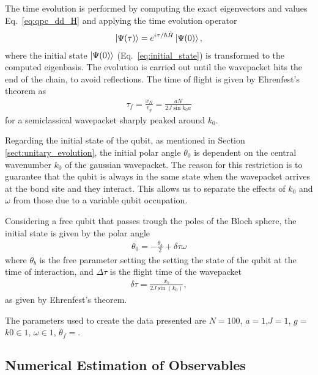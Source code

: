 \documentclass[10pt,
 amsmath,amssymb,
 aps,prb, twocolumn
]{revtex4-2}
\newcommand\sj[1]{ {\color{cyan} #1} }
\begin{document}
The time evolution is performed by computing the exact eigenvectors and values Eq.~\eqref{eq:qpc_dd_H} and applying the time evolution operator
\begin{align}\label{eq:time_evolution_ed}
    \ket{\Psi{(\tau)}} = e^{i\tau/\hbar \hat{H}}\ket{\Psi (0)},
\end{align}
where the initial state \mbox{$\ket{\Psi (0)}$} (Eq.~\eqref{eq:initial_state}) is transformed to the computed eigenbasis. The evolution is carried out until the wavepacket hits the end of the chain, to avoid reflections. The time of flight is given by Ehrenfest's theorem as
\begin{align}\label{eq:final_time}
    \tau_f = \frac{x_N}{v_g} =  \frac{a N}{2 J \sin{k_0a}}
\end{align}
for a semiclassical wavepacket sharply peaked around $k_0$.

Regarding the initial state of the qubit, as mentioned in Section \ref{sect:unitary_evolution}, the initial polar angle $\theta_0$ is dependent on the central wavenumber $k_0$ of the gaussian wavepacket. The reason for this restriction is to guarantee that the qubit is always in the same state when the wavepacket arrives at the bond site and they interact. This allows us to separate the effects of $k_0$ and $\omega$ from those due to a variable qubit occupation. 

Considering a free qubit that passes trough the poles of the Bloch sphere, the initial state is given by the polar angle
\begin{align}\label{eq:qubit_init}
    \theta_0 = - \frac{\theta_b}{2}+\delta\tau \omega
\end{align}
where $\theta_b$ is the free parameter setting the setting the state of the qubit at the time of interaction, and $\Delta \tau$ is the flight time of the wavepacket 
\begin{align}
    \delta \tau = \frac{x_b}{2J\sin(k_0)},
\end{align}
as given by Ehrenfest's theorem.

\sj{The parameters used to create the data presented are \mbox{$N=100$}, \mbox{$a=1$},\mbox{$J=1$}, \mbox{$g=$} \mbox{$k0\in1$}, \mbox{$\omega\in1$}, \mbox{$\theta_f=$}.}



\subsection{Numerical Estimation of Observables}
\end{document}
